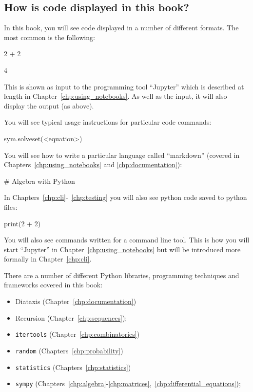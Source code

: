 \subsection{How is code displayed in this book?}

In this book, you will see code displayed in a number of different formats. The
most common is the following:

\begin{pyin}
2 + 2
\end{pyin}

4

This is shown as input to the programming tool ``Jupyter'' which is described at
length in Chapter~\ref{chp:using_notebooks}. As well as the input, it will also
display the output (as above).

You will see typical usage instructions for particular code commands:

\begin{api}
sym.solveset(<equation>)
\end{api}

You will see how to write a particular language called ``markdown'' (covered in
Chapters~\ref{chp:using_notebooks} and \ref{chp:documentation}):

\begin{md}
# Algebra with Python
\end{md}

In Chapters~\ref{chp:cli}-~\ref{chp:testing} you will also see python code saved
to python files:

\begin{python}
print(2 + 2)
\end{python}

You will also see commands written for a command line tool. This is how you will
start ``Jupyter'' in Chapter~\ref{chp:using_notebooks} but will be introduced
more formally in Chapter~\ref{chp:cli}.


There are a number of different Python libraries, programming techniques and frameworks covered in this
book:

\begin{itemize}
    \item Diataxis (Chapter~\ref{chp:documentation})
    \item Recursion (Chapter~\ref{chp:sequences});
    \item \texttt{itertools} (Chapter~\ref{chp:combinatorics})
    \item \texttt{random} (Chapters~\ref{chp:probability})
    \item \texttt{statistics} (Chapters~\ref{chp:statistics})
    \item \texttt{sympy} (Chapters~\ref{chp:algebra}-\ref{chp:matrices},~\ref{chp:differential_equations});
\end{itemize}

